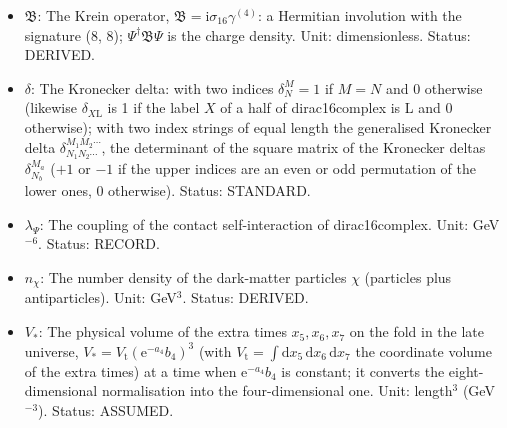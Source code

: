 \documentclass[
  10pt,
]{article}
\begin{document}
\begin{itemize}
  states, its adjoint with respect to the scalar product of that space
  (for the quantised dirac16complex the indefinite Krein scalar
  product). Status: STANDARD.
\item
  \(\mathfrak{B}\): The Krein operator,
  \(\mathfrak{B} = \mathrm{i}\sigma_{16}\gamma^{(4)}\): a Hermitian
  involution with the signature (8, 8); \(\Psi^\dagger\mathfrak{B}\Psi\)
  is the charge density. Unit: dimensionless. Status: DERIVED.
\item
  \(\delta\): The Kronecker delta: with two indices \(\delta^M_N = 1\)
  if \(M = N\) and 0 otherwise (likewise \(\delta_{X\mathrm{L}}\) is 1
  if the label \(X\) of a half of dirac16complex is L and 0 otherwise);
  with two index strings of equal length the generalised Kronecker delta
  \(\delta^{M_1M_2\cdots}_{N_1N_2\cdots}\), the determinant of the
  square matrix of the Kronecker deltas \(\delta^{M_a}_{N_b}\) (\(+1\)
  or \(-1\) if the upper indices are an even or odd permutation of the
  lower ones, 0 otherwise). Status: STANDARD.
\item
  \(\lambda_\Psi\): The coupling of the contact self-interaction of
  dirac16complex. Unit: GeV\(^{-6}\). Status: RECORD.
\item
  \(n_\chi\): The number density of the dark-matter particles \(\chi\)
  (particles plus antiparticles). Unit: GeV\(^3\). Status: DERIVED.
\item
  \(V_*\): The physical volume of the extra times \(x_5, x_6, x_7\) on
  the fold in the late universe,
  \(V_* = V_{\mathrm{t}}(\mathrm{e}^{-a_4}b_4)^3\) (with
  \(V_{\mathrm{t}} = \int\mathrm{d}x_5\,\mathrm{d}x_6\,\mathrm{d}x_7\)
  the coordinate volume of the extra times) at a time when
  \(\mathrm{e}^{-a_4}b_4\) is constant; it converts the
  eight-dimensional normalisation into the four-dimensional one. Unit:
  length\(^3\) (GeV\(^{-3}\)). Status: ASSUMED.
\end{itemize}
\end{document}
